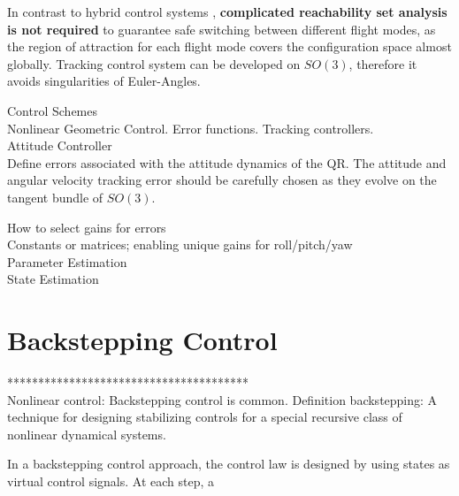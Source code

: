 In contrast to hybrid control systems \cite{Gillula2010}, \textbf{complicated reachability set analysis is not required} to guarantee safe switching between different flight modes, as the region of attraction for each flight mode covers the configuration space almost globally.
Tracking control system can be developed on $ SO(3) $, therefore it avoids singularities of Euler-Angles.


Control Schemes\\
Nonlinear Geometric Control. Error functions. Tracking controllers.\\

Attitude Controller\\

Define errors associated with the attitude dynamics of the QR. The attitude and angular velocity tracking error should be carefully chosen as they evolve on the tangent bundle of  $ SO(3) $. \cite{Lee 2010c} 

How to select gains for errors\\
Constants \cite{Lee2010} or matrices; enabling unique gains for roll/pitch/yaw \cite{Mellinger2011}\\

Parameter Estimation\\
State Estimation\\

\section{Backstepping Control}

***************************************\\
Nonlinear control: Backstepping control is common.
Definition backstepping: A technique for designing stabilizing controls for a special recursive class of nonlinear dynamical systems.

In a backstepping control approach, the control law is designed by using states as virtual control signals. At each step, a 

